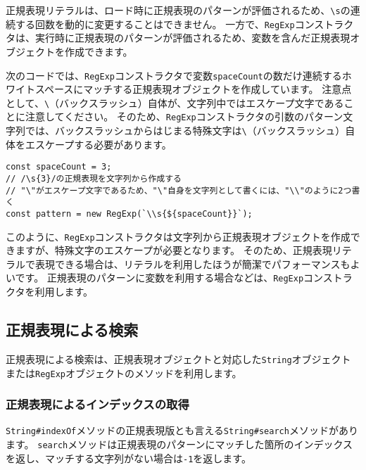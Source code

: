 正規表現リテラルは、ロード時に正規表現のパターンが評価されるため、\texttt{\textbackslash s}の連続する回数を動的に変更することはできません。
一方で、\texttt{RegExp}コンストラクタは、実行時に正規表現のパターンが評価されるため、変数を含んだ正規表現オブジェクトを作成できます。

次のコードでは、\texttt{RegExp}コンストラクタで変数\texttt{spaceCount}の数だけ連続するホワイトスペースにマッチする正規表現オブジェクトを作成しています。
注意点として、\texttt{\textbackslash}（バックスラッシュ）自体が、文字列中ではエスケープ文字であることに注意してください。
そのため、\texttt{RegExp}コンストラクタの引数のパターン文字列では、バックスラッシュからはじまる特殊文字は\texttt{\textbackslash}（バックスラッシュ）自体をエスケープする必要があります。

\begin{lstlisting}
const spaceCount = 3;
// /\s{3}/の正規表現を文字列から作成する
// "\"がエスケープ文字であるため、"\"自身を文字列として書くには、"\\"のように2つ書く
const pattern = new RegExp(`\\s{${spaceCount}}`);
\end{lstlisting}

このように、\texttt{RegExp}コンストラクタは文字列から正規表現オブジェクトを作成できますが、特殊文字のエスケープが必要となります。
そのため、正規表現リテラルで表現できる場合は、リテラルを利用したほうが簡潔でパフォーマンスもよいです。
正規表現のパターンに変数を利用する場合などは、\texttt{RegExp}コンストラクタを利用します。

\hypertarget{search-by-regexp}{%
\subsection{正規表現による検索}\label{search-by-regexp}}

正規表現による検索は、正規表現オブジェクトと対応した\texttt{String}オブジェクトまたは\texttt{RegExp}オブジェクトのメソッドを利用します。

\hypertarget{search-index-by-regexp}{%
\subsubsection{正規表現によるインデックスの取得}\label{search-index-by-regexp}}

\texttt{String\#indexOf}メソッドの正規表現版とも言える\texttt{String\#search}メソッドがあります。
\texttt{search}メソッドは正規表現のパターンにマッチした箇所のインデックスを返し、マッチする文字列がない場合は\texttt{-1}を返します。

